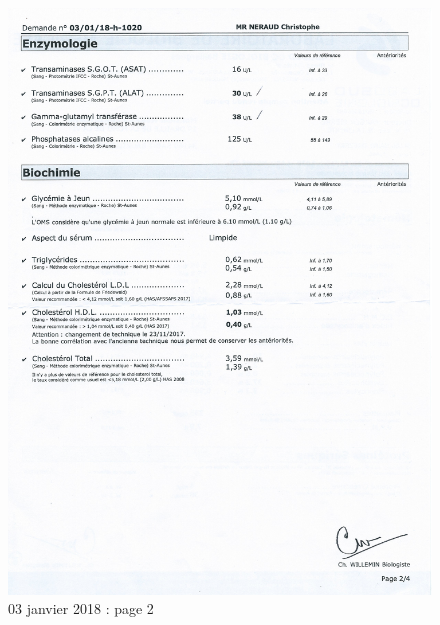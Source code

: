 \documentclass[12pt]{article}
\begin{document}
	\begin{figure}[!h]
		\begin{center}
		\includegraphics[scale=0.79]{03-01-2018/p2.JPG}
		\end{center}
		\caption{03 janvier 2018 : page 2}
	\end{figure}
	
\end{document}
